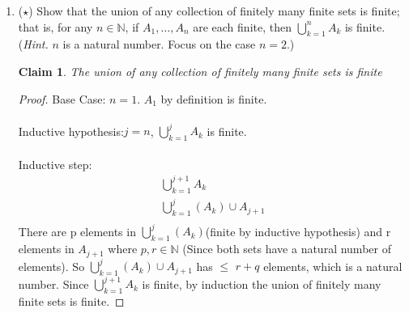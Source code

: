 \documentclass[11pt]{letter}
\newtheorem{claim}{Claim}
\theoremstyle{definition}
\begin{document}
\begin{description}
\begin{enumerate}
    \begin{proof}
      Assume $f$ is not injective. Then $\exists f(x)=f(y)$ where $x,y\in X$ and $x\neq y$. Assume $x\in f^*(f_*(A))$. So $f(x)\in f_*(A)$. So $x\in A$, however $y\notin A$ (Since $a$ is already in it for $f(x)$ which equals $f(y)$). Therefore by contrapositive, if $f^*(f_*(A))=A$, then $f$ is injective.   
    \end{proof}
    
		\item ($\star$) Show that the union of any collection of finitely many finite sets is finite; that is, for any $n\in\mathbb{N}$, if $A_1,\ldots,A_n$ are each finite, then $\displaystyle\bigcup_{k=1}^nA_k$ is finite. ({\em Hint.} $n$ is a natural number. Focus on the case $n=2$.)
                  \begin{claim}
                    The union of any collection of finitely many finite sets is finite
                  \end{claim}
                  \begin{proof}
                    Base Case: $n=1$. $A_1$ by definition is finite.\\ \\
                    Inductive hypothesis:$j=n$, $\displaystyle\bigcup_{k=1}^jA_k$ is finite. \\ \\
                    Inductive step:
                    \begin{align*}
                      \displaystyle\bigcup_{k=1}^{j+1}A_k \\
                      \displaystyle\bigcup_{k=1}^j(A_k)\cup A_{j+1}\\
                    \end{align*}
                    There are p elements in $\displaystyle\bigcup_{k=1}^j(A_k)$(finite by inductive hypothesis) and r elements in $A_{j+1}$ where $p,r\in \mathbb{N}$ (Since both sets have a natural number of elements). So $\displaystyle\bigcup_{k=1}^j(A_k)\cup A_{j+1}$ has $\leq$ $r+q$ elements, which is a natural number. Since $\displaystyle\bigcup_{k=1}^{j+1}A_k$ is finite, by induction the union of finitely many finite sets is finite.
                  \end{proof}
                  

\end{enumerate}
\end{description}
\end{document}
